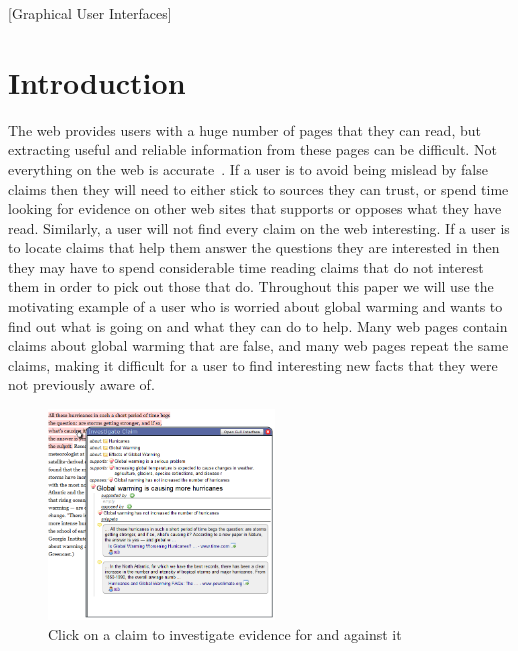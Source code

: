 \documentclass{chi2009}
\begin{document}

[Graphical User Interfaces]

\section{Introduction}

The web provides users with a huge number of pages that they can read, but extracting useful and reliable information from these pages can be difficult. Not everything on the web is accurate~\cite{bbcwebwarning}. If a user is to avoid being mislead by false claims then they will need to either stick to sources they can trust, or spend time looking for evidence on other web sites that supports or opposes what they have read. Similarly, a user will not find every claim on the web interesting. If a user is to locate claims that help them answer the questions they are interested in then they may have to spend considerable time reading claims that do not interest them in order to pick out those that do. Throughout this paper we will use the motivating example of a user who is worried about global warming and wants to find out what is going on and what they can do to help. Many web pages contain claims about global warming that are false, and many web pages repeat the same claims, making it difficult for a user to find interesting new facts that they were not previously aware of.

\begin{figure}[tb]
	\begin{center}
	\includegraphics[width=6cm]{../screenshots/claim_popup_crop2.png}
	\caption{Click on a claim to investigate evidence for and against it}
	\label{claimview}
	\end{center}
\end{figure}
\end{document}
